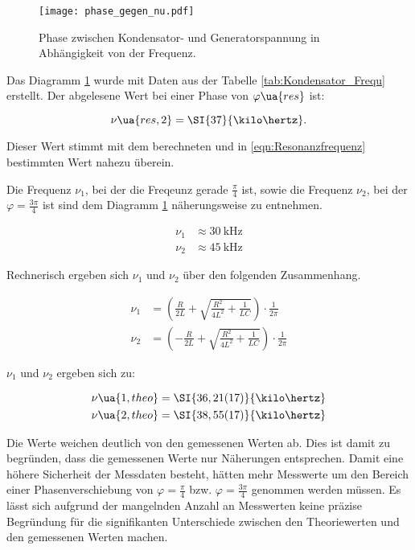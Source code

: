 \begin{figure}
  \centering
  \texttt{[image: phase\_gegen\_nu.pdf]}
  \caption{Phase zwischen Kondensator- und Generatorspannung in Abhängigkeit von der Frequenz.}
  \label{fig:Resonanz}
\end{figure}


Das Diagramm \ref{fig:Resonanz} wurde mit Daten aus der Tabelle
\ref{tab:Kondensator_Frequ} erstellt.
Der abgelesene Wert bei einer Phase von $\varphi\ua{res}$ ist:

\begin{equation*}
  \nu\ua{res,2} = \SI{37}{\kilo\hertz}.
\end{equation*}

Dieser Wert stimmt mit dem berechneten und in \eqref{eqn:Resonanzfrequenz} bestimmten
Wert nahezu überein.

Die Frequenz $\nu_1$, bei der die Freqeunz gerade $\frac{\pi}{4}$ ist, sowie die
Frequenz $\nu_2$, bei der $\varphi = \frac{3\pi}{4}$ ist sind dem Diagramm \ref{fig:Resonanz}
näherungsweise zu entnehmen.

\begin{align*}
  \nu_1 &\approx \SI{30}{\kilo\hertz} \\
  \nu_2 &\approx \SI{45}{\kilo\hertz}
\end{align*}

Rechnerisch ergeben sich $\nu_1$ und $\nu_2$ über den folgenden Zusammenhang.

\begin{align}
  \nu_1 &= (\frac{R}{2L} + \sqrt{\frac{R^2}{4L^2} + \frac{1}{LC}})\cdot \frac{1}{2\pi} \\
  \nu_2 &= (-\frac{R}{2L} + \sqrt{\frac{R^2}{4L^2} + \frac{1}{LC}})\cdot \frac{1}{2\pi}
\end{align}

$\nu_1$ und $\nu_2$ ergeben sich zu:

\begin{align*}
  \nu\ua{1,theo} &= \SI{36,21(17)}{\kilo\hertz} \\
  \nu\ua{2,theo} &= \SI{38,55(17)}{\kilo\hertz}
\end{align*}

Die Werte weichen deutlich von den gemessenen Werten ab.
Dies ist damit zu begründen, dass die gemessenen Werte nur Näherungen entsprechen.
Damit eine höhere Sicherheit der Messdaten besteht, hätten mehr Messwerte um den
Bereich einer Phasenverschiebung von $\varphi = \frac{\pi}{4}$ bzw.
$\varphi = \frac{3\pi}{4}$ genommen werden müssen. Es lässt sich aufgrund der
mangelnden Anzahl an Messwerten keine präzise Begründung für die signifikanten Unterschiede
zwischen den Theoriewerten und den gemessenen Werten machen.

